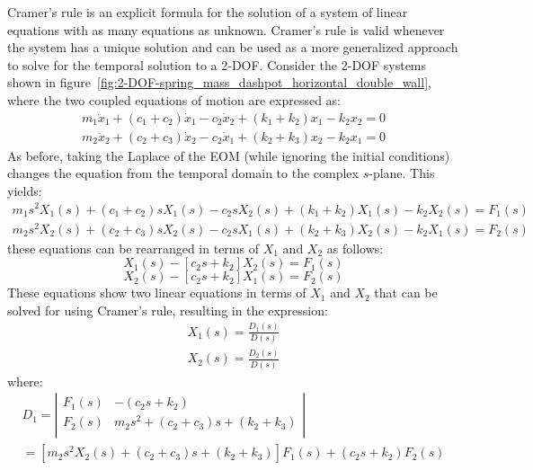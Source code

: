 \documentclass[12pt,letter]{article}
\numberwithin{ex}{section} %
\numberwithin{re}{section} %
\begin{document}
Cramer's rule is an explicit formula for the solution of a system of linear equations with as many equations as unknown. Cramer's rule is valid whenever the system has a unique solution and can be used as a more generalized approach to solve for the temporal solution to a 2-DOF. Consider the 2-DOF systems shown in figure~\ref{fig:2-DOF-spring_mass_dashpot_horizontal_double_wall}, where the two coupled equations of motion are expressed as: 
\begin{eqnarray}
m_1\ddot{x}_1 + (c_1+c_2)\dot{x}_1 - c_2\dot{x}_2 + (k_1+k_2)x_1 - k_2x_2 =0 \\
m_2\ddot{x}_2 + (c_2+c_3)\dot{x}_2 - c_2\dot{x}_1 + (k_2+k_3)x_2 - k_2x_1 =0 \nonumber
\end{eqnarray}
As before, taking the Laplace of the EOM (while ignoring the initial conditions) changes the equation from the temporal domain to the complex $s$-plane. This yields:
\begin{eqnarray}
m_1 s^2 X_1(s) + (c_1 + c_2)sX_1(s) - c_2sX_2(s) + (k_1+k_2)X_1(s) - k_2X_2(s) = F_1(s) \\
m_2 s^2 X_2(s) + (c_2 + c_3)sX_2(s) - c_2sX_1(s) + (k_2+k_3)X_2(s) - k_2X_1(s) = F_2(s) \nonumber
\end{eqnarray}
these equations can be rearranged in terms of $X_1$ and $X_2$ as follows:
\begin{equation}
[m_1 s^2 + (c_1 + c_2)s + (k_1+k_2)]X_1(s) - [c_2s+k_2]X_2(s) = F_1(s) 
\end{equation}
\begin{equation}
[m_2 s^2 + (c_2 + c_3)s + (k_2+k_3)]X_2(s) - [c_2s+k_2]X_1(s) = F_2(s) \nonumber
\end{equation}
These equations show two linear equations in terms of $X_1$ and $X_2$ that can be solved for using Cramer's rule, resulting in the expression:
\begin{eqnarray}
X_1(s) = \frac{D_1(s)}{D(s)} \\
X_2(s) = \frac{D_2(s)}{D(s)} \nonumber
\end{eqnarray}
where:
\begin{eqnarray}
D_1 = \left|
\begin{array}{cc}
F_1(s)  & -(c_2s+k_2) \\
F_2(s)  & m_2 s^2 + (c_2 + c_3)s + (k_2+k_3) \\
\end{array}
\right| \\
= [m_2 s^2 X_2(s) + (c_2 + c_3)s +(k_2+k_3)]F_1(s) + (c_2s+k_2)F_2(s)  \nonumber
\end{eqnarray}
\end{document}
